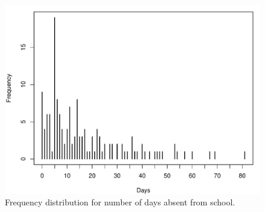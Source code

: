 \documentclass[article]{jss}
\begin{document}
\begin{figure}[t!]
\centering
\includegraphics{article-visualization}
\caption{\label{fig:quine} Frequency distribution for number of days absent
from school.}
\end{figure}
\end{document}
